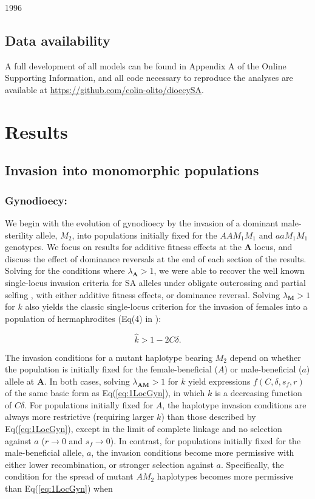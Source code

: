 1996\documentclass[9pt,twocolumn,twoside,lineno]{gsajnl}
\begin{document}
\subsection{Data availability}
A full development of all models can be found in Appendix A of the Online Supporting Information, and all code necessary to reproduce the analyses are available at \url{https://github.com/colin-olito/dioecySA}.

\section{Results}

\subsection{Invasion into monomorphic populations}

\subsubsection{Gynodioecy:} We begin with the evolution of gynodioecy by the invasion of a dominant male-sterility allele, $M_2$, into populations initially fixed for the $AAM_1M_1$ and $aaM_1M_1$ genotypes. We focus on results for additive fitness effects at the $\mathbf{A}$ locus, and discuss the effect of dominance reversals at the end of each section of the results. Solving for the conditions where $\lambda_{\mathbf{A}} > 1$, we were able to recover the well known single-locus invasion criteria for SA alleles under obligate outcrossing \citep{Kidwell1977} and partial selfing \citep{JordanConnallon2014,Olito2016}, with either additive fitness effects, or dominance reversal. Solving $\lambda_{\mathbf{M}} > 1$ for $k$ also yields the classic single-locus criterion for the invasion of females into a population of hermaphrodites (Eq(4) in \citealt{Charlesworth1978a}):

\begin{equation}\label{eq:1LocGyn}
	\hat{k} > 1 - 2 C \delta.
\end{equation}

\noindent The invasion conditions for a mutant haplotype bearing $M_2$ depend on whether the population is initially fixed for the female-beneficial ($A$) or male-beneficial ($a$) allele at $\mathbf{A}$. In both cases, solving $\lambda_{\mathbf{AM}} > 1$ for $k$ yield expressions $f(C,\delta,s_f,r)$ of the same basic form as Eq(\ref{eq:1LocGyn}), in which $k$ is a decreasing function of $C \delta$. For populations initially fixed for $A$, the haplotype invasion conditions are always more restrictive (requiring larger $k$) than those described by Eq(\ref{eq:1LocGyn}), except in the limit of complete linkage and no selection against $a$ ($r \rightarrow 0$ and $s_f \rightarrow  0$). In contrast, for populations initially fixed for the male-beneficial allele, $a$, the invasion conditions become more permissive with either lower recombination, or stronger selection against $a$. Specifically, the condition for the spread of mutant $AM_2$ haplotypes becomes more permissive than Eq(\ref{eq:1LocGyn}) when 
\end{document}
